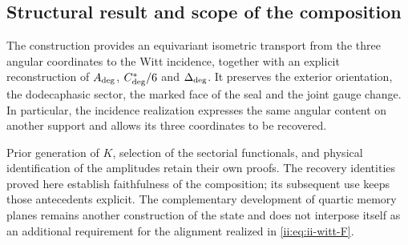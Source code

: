\subsection{Structural result and scope of the composition}

The construction provides an equivariant isometric transport from the three angular coordinates to the Witt incidence, together with an explicit reconstruction of \(A_{\rm deg}\), \(C^*_{\rm deg}/6\) and \(\Delta_{\rm deg}\). It preserves the exterior orientation, the dodecaphasic sector, the marked face of the seal and the joint gauge change. In particular, the incidence realization expresses the same angular content on another support and allows its three coordinates to be recovered.

Prior generation of \(K\), selection of the sectorial
functionals, and physical identification of the amplitudes retain their
own proofs. The recovery identities proved here
establish faithfulness of the composition; its subsequent use keeps
those antecedents explicit. The complementary development of quartic
memory planes remains another construction of the state and does not
interpose itself as an additional requirement for the alignment realized in
\eqref{ii:eq:ii-witt-F}.
